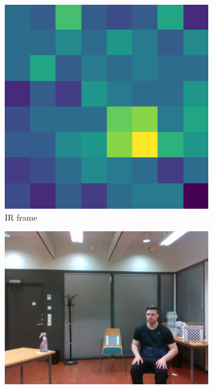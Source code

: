 \begin{figure}
    \centering
    \begin{subfigure}[t]{0.3\textwidth}
        \includegraphics[width=\textwidth]{fig/5/ir_t_24.0.png}
        \caption{IR frame}
        \label{fig:my_label}
    \end{subfigure}
    \hfill
    \begin{subfigure}[t]{0.3\textwidth}
        \includegraphics[width=\textwidth]{fig/5/rgb_t_24.0.png}

\end{subfigure}
\end{figure}
